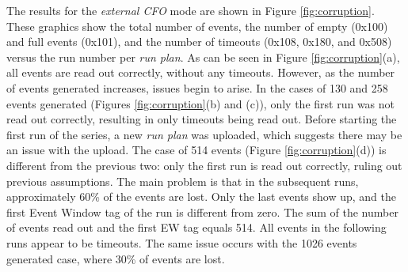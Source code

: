 The results for the \textit{external CFO} mode are shown in Figure \ref{fig:corruption}. 
These graphics show the total number of events, the number of empty (0x100) and full events (0x101), and 
the number of timeouts (0x108, 0x180, and 0x508) versus the run number per \textit{run plan}.
As can be seen in Figure \ref{fig:corruption}(a), all events are read out correctly, without any timeouts.
However, as the number of events generated increases, issues begin to arise.
In the cases of 130 and 258 events generated (Figures \ref{fig:corruption}(b) and (c)), only the first run 
was not read out correctly, resulting in only timeouts being read out.
Before starting the first run of the series, a new \textit{run plan} was uploaded, 
which suggests there may be an issue with the upload.
The case of 514 events (Figure \ref{fig:corruption}(d)) is different from the previous two: 
only the first run is read out correctly, ruling out previous assumptions. The main problem is 
that in the subsequent runs, approximately 60\% of the events are lost. Only the last events 
show up, and the first Event Window tag of the run is different from zero. The sum of the number 
of events read out and the first EW tag equals 514.
All events in the following runs appear to be timeouts. The same issue occurs with the 
1026 events generated case, where 30\% of events are lost.


